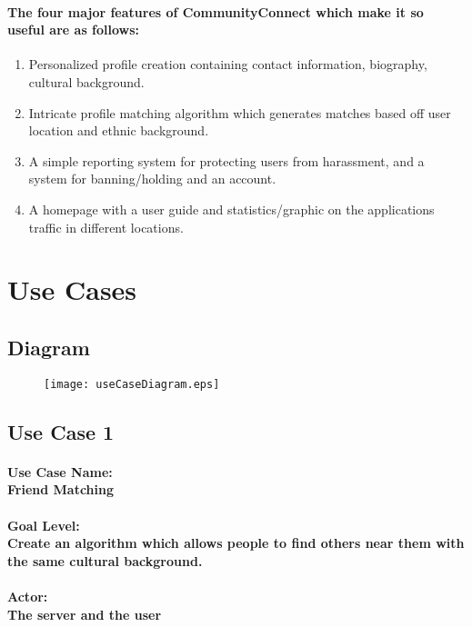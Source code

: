 \documentclass[12pt]{article}
\begin{document}
		\paragraph{\normalfont The four major features of CommunityConnect which make it so useful are as follows:}
		\begin{enumerate}
			\item Personalized profile creation containing contact information, biography, cultural background.
			\item Intricate profile matching algorithm which generates matches based off user location and ethnic background.
			\item A simple reporting system for protecting users from harassment, and a system for banning/holding and an account.
			\item A homepage with a user guide and statistics/graphic on the applications traffic in different locations.
		\end{enumerate}
\newpage
\section{\bf Use Cases}
  \subsection{\bf Diagram}
	
	\begin{figure}[h]
  		\texttt{[image: useCaseDiagram.eps]}
	\end{figure}

	\subsection{\bf Use Case 1}
			\paragraph{\normalfont \textbf{Use Case Name:}\\ Friend Matching
  			}
			\paragraph{\normalfont \textbf{Goal Level:}\\Create an algorithm which allows people to find others near them with the same cultural background.
	  		}
			\paragraph{\normalfont \textbf{Actor:}\\The server and the user
			}
\end{document}
